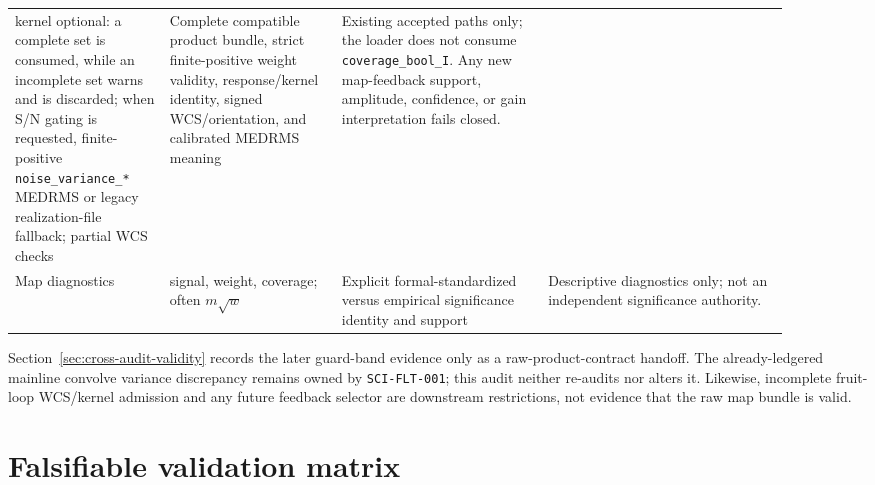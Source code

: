 \documentclass[11pt]{article}
\newcommand{\code}[1]{\nolinkurl{#1}}
\begin{document}
\begin{longtable}{L{0.18\linewidth}L{0.20\linewidth}L{0.24\linewidth}L{0.28\linewidth}}
kernel optional: a complete set is consumed, while an incomplete set warns and
is discarded; when S/N gating is requested, finite-positive
\code{noise_variance_*} MEDRMS or legacy realization-file fallback; partial
WCS checks & Complete compatible product bundle,
strict finite-positive weight validity, response/kernel identity, signed
WCS/orientation, and calibrated MEDRMS meaning & Existing accepted paths only;
the loader does not consume \code{coverage_bool_I}.  Any new map-feedback
support, amplitude, confidence, or gain interpretation fails closed.\\
Map diagnostics & signal, weight, coverage; often \(m\sqrt w\) & Explicit
formal-standardized versus empirical significance identity and support &
Descriptive diagnostics only; not an independent significance authority.\\
\bottomrule
\end{longtable}

Section~\ref{sec:cross-audit-validity} records the later guard-band evidence
only as a raw-product-contract handoff.  The already-ledgered mainline convolve
variance discrepancy remains owned by \code{SCI-FLT-001}; this audit neither
re-audits nor alters it.  Likewise, incomplete fruit-loop WCS/kernel admission
and any future feedback selector are downstream restrictions, not evidence that
the raw map bundle is valid.

\section{Falsifiable validation matrix}
\end{document}
